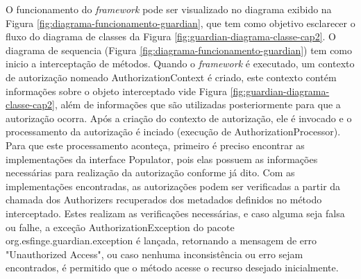 \par O funcionamento do \textit{framework} pode ser visualizado no diagrama exibido na Figura \ref{fig:diagrama-funcionamento-guardian}, que tem como objetivo esclarecer o fluxo do diagrama de classes da Figura \ref{fig:guardian-diagrama-classe-cap2}. O diagrama de sequencia (Figura \ref{fig:diagrama-funcionamento-guardian}) tem como inicio a interceptação de métodos. Quando o \textit{framework} é executado, um contexto de autorização nomeado AuthorizationContext é criado, este contexto contém informações sobre o objeto interceptado vide Figura \ref{fig:guardian-diagrama-classe-cap2}, além de informações que são utilizadas posteriormente para que a autorização ocorra. Após a criação do contexto de autorização, ele é invocado e o processamento da autorização é inciado (execução de AuthorizationProcessor). Para que este processamento aconteça, primeiro é preciso encontrar as implementações da interface Populator, pois elas possuem as informações necessárias para realização da autorização conforme já dito. Com as implementações encontradas, as autorizações podem ser verificadas a partir da chamada dos Authorizers recuperados dos metadados definidos no método interceptado. Estes realizam as verificações necessárias, e caso alguma seja falsa ou falhe, a exceção AuthorizationException do pacote org.esfinge.guardian.exception é lançada, retornando a mensagem de erro "Unauthorized Access", ou caso nenhuma inconsistência ou erro sejam encontrados, é permitido que o método acesse o recurso desejado inicialmente.

